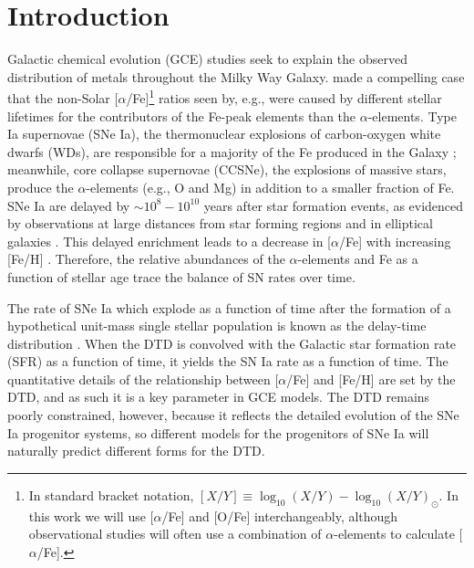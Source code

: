 \documentclass[twocolumn,twocolappendix,linenumbers,trackchanges]{aastex631}
\newcommand{\aFe}{[$\alpha$/Fe]\xspace}
\begin{document}
\section{Introduction}

Galactic chemical evolution (GCE) studies seek to explain the observed distribution of metals throughout the Milky Way Galaxy. \citet{Tinsley1979-StellarLifetimes} made a compelling case that the non-Solar \aFe\footnote{
    In standard bracket notation, $[X/Y]\equiv \log_{10}(X/Y) - \log_{10}(X/Y)_{\odot}$. In this work we will use \aFe and [O/Fe] interchangeably, although observational studies will often use a combination of $\alpha$-elements to calculate \aFe.
} ratios seen by, e.g., \citet{Wallerstein1962-GDwarfAbundances} were caused by different stellar lifetimes for the contributors of the Fe-peak elements than the $\alpha$-elements. 
Type Ia supernovae (SNe Ia), the thermonuclear explosions of carbon-oxygen white dwarfs (WDs), are responsible for a majority of the Fe produced in the Galaxy \citep{Matteucci1986-SupernovaEnrichment}; meanwhile, core collapse supernovae (CCSNe), the explosions of massive stars, produce the $\alpha$-elements (e.g., O and Mg) in addition to a smaller fraction of Fe.
SNe Ia are delayed by $\sim10^8 - 10^{10}$ years after star formation events, as evidenced by observations at large distances from star forming regions and in elliptical galaxies \citep[e.g.,][]{Maza1976-SNStatistics}.
This delayed enrichment leads to a decrease in \aFe with increasing [Fe/H] \citep{Matteucci1986-SupernovaEnrichment}.
Therefore, the relative abundances of the $\alpha$-elements and Fe as a function of stellar age trace the balance of SN rates over time.

The rate of SNe Ia which explode as a function of time after the formation of a hypothetical unit-mass single stellar population is known as the delay-time distribution \citep[DTD; for a review, see Section 3.5 of][]{Maoz2014-Review}.
When the DTD is convolved with the Galactic star formation rate (SFR) as a function of time, it yields the SN Ia rate as a function of time. 
The quantitative details of the relationship between \aFe and [Fe/H] are set by the DTD, and as such it is a key parameter in GCE models.
The DTD remains poorly constrained, however, because it reflects the detailed evolution of the SNe Ia progenitor systems, so different models for the progenitors of SNe Ia will naturally predict different forms for the DTD.
\end{document}
